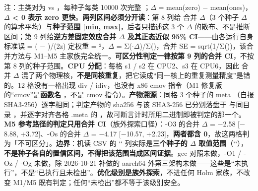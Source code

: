 \documentclass[UTF8,fontset=fandol,11pt,a4paper]{ctexart}
\begin{document}
\begin{landscape}
\noindent 注：主类对为 \texttt{} vs \texttt{}，每种子每类 10000 次完整 \texttt{}；\texorpdfstring{$\Delta$}{Delta} = mean(zero) \texorpdfstring{$-$}{-} mean(ones)，\textbf{\texorpdfstring{$\Delta$}{Delta} < 0 表示 zero 更快}。\textbf{两列区间必须分开读}：第 8 列给 合并 \texorpdfstring{$\Delta$}{Delta}（3 个种子 \texorpdfstring{$\Delta$}{Delta} 的算术平均）与\textbf{种子范围 [min, max]}，后者只描述这 3 个 \texorpdfstring{$\Delta$}{Delta} 的散布、不是推断区间；第 9 列给\textbf{逆方差固定效应合并 \texorpdfstring{$\Delta$}{Delta}\texttt{} 及其正态近似 95\% CI}——由各运行自身标准误 \texttt{} = (\texttt{} \texorpdfstring{$-$}{-} \texttt{})/(2z) 定权重 \texttt{} = \texttt{}²，\texorpdfstring{$\Delta$}{Delta}\texttt{} = Σ(\texttt{}\texorpdfstring{$\cdot$}{.}\texorpdfstring{$\Delta$}{Delta}\texttt{})/Σ(\texttt{})，合并 SE = sqrt(1/Σ(\texttt{}))，该合并方法与 M1–M5 主家族完全统一。\textbf{可区分性判定一律按第 9 列的合并 CI}，不按第 8 列的种子范围。\textbf{CPU 分配}：每格 s1 / s2 在 CPU2、s3 在 CPU6，因此 合并 \texorpdfstring{$\Delta$}{Delta} 混了两个物理核，\textbf{不是同核重复}，把它读成“同一核上的重复测量精度”是错的。12 格没有一格出现 div / idiv，也没有 x86 cmov 指令（M1 修复版的“cmov”是\textbf{函数名} \texttt{}，不是 cmov 指令）。\textbf{产物溯源}：同格 3 个种子的 meta \texttt{}（自报 SHA3-256）逐字相同；判定产物的 sha256 与该 SHA3-256 已分别落盘于 \texttt{} 与同目录 \texttt{}，并逐字对齐各格 .meta 的 \texttt{}，故可断言计时所用二进制即被判定的那一个。\textbf{M5 参考路径的判定只用合并 CI}（族外探索口径）：-O3 的合并 \texorpdfstring{$\Delta$}{Delta}\texttt{} = \texorpdfstring{$-$}{-}2.58 [\texorpdfstring{$-$}{-}8.88, +3.72]、-Os 的合并 \texorpdfstring{$\Delta$}{Delta}\texttt{} = \texorpdfstring{$-$}{-}4.17 [\texorpdfstring{$-$}{-}10.57, +2.23]，\textbf{两者都含 0}，故这两格判为「不可区分」。\textbf{边界}：机读 CSV 的 `\texttt{}` 列实际是\textbf{三个种子的 \texorpdfstring{$\Delta$}{Delta} 取值范围}（`\texttt{}`），\textbf{不是种子各自的置信区间，不得把该范围当成区间证据}。gcc 对照未做，-O1 / -Oz / -Og 未做，除 2026-10-21 补做的 aarch64 外第三架构未做——这些是“未执行”，不是“已执行且未检出”。\textbf{优化级别是族外探索}，不进任何 Holm 家族，不改变 M1/M5 既有判定；任何“未检出”都不等于该级别安全。\par\endgroup\vspace{3mm}\end{landscape}
\end{document}
